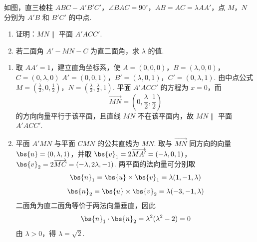 \begin{problem}
如图，直三棱柱 \(ABC - A'B'C'\)，\(\angle BAC = 90^\circ\)，\(AB = AC = \lambda AA'\)，点 \(M\)，\(N\) 分别为 \(A'B\) 和 \(B'C'\) 的中点.

\begin{enumerate}
\item 证明：\(MN \parallel\) 平面 \(A'ACC'\).
\item 若二面角 \(A' - MN - C\) 为直二面角，求 \(\lambda\) 的值.
\end{enumerate}

\end{problem}

\begin{solution}
\begin{enumerate}
\item 取 \(AA'=1\)，建立直角坐标系，使
\(A=(0,0,0)\)，\(B=(\lambda,0,0)\)，\(C=(0,\lambda,0)\)
\(A'=(0,0,1)\)，\(B'=(\lambda,0,1)\)，\(C'=(0,\lambda,1)\).
由中点公式
\(M=\left(\frac\lambda2,0,\frac12\right)\)，\(N=\left(\frac\lambda2,\frac\lambda2,1\right)\).
平面 \(A'ACC'\) 的方程为 \(x=0\)，而
\[
\overrightarrow{MN}=\left(0,\frac\lambda2,\frac12\right)
\]
的方向向量平行于该平面，且直线 \(MN\) 不在该平面内，故 \(MN\parallel\) 平面 \(A'ACC'\).
\item 平面 \(A'MN\) 与平面 \(CMN\) 的公共直线为 \(MN\). 取与 \(\overrightarrow{MN}\) 同方向的向量 \(\bs{u}=(0,\lambda,1)\)，并取
\(\bs{v}_1=2\overrightarrow{MA'}=(-\lambda,0,1)\)，\(\bs{v}_2=2\overrightarrow{MC}=(-\lambda,2\lambda,-1)\).
两平面的法向量可分别取
\[
\bs{n}_1=\bs{u}\times\bs{v}_1=\lambda(1,-1,\lambda)
\]
\[
\bs{n}_2=\bs{u}\times\bs{v}_2=\lambda(-3,-1,\lambda)
\]
二面角为直二面角等价于两法向量垂直，因此
\[
\bs{n}_1\cdot\bs{n}_2=\lambda^2(\lambda^2-2)=0
\]
由 \(\lambda>0\)，得 \(\lambda=\sqrt2\).
\end{enumerate}
\end{solution}

